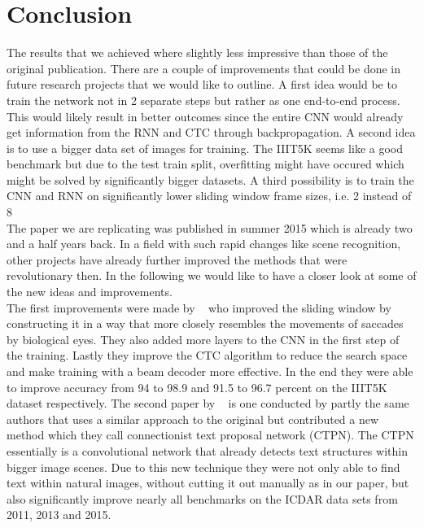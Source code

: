 \documentclass{utue} %
\begin{document}
\section{Conclusion}
The results that we achieved where slightly less impressive than those of the original publication. There are a couple of improvements that could be done in future research projects that we would like to outline. A first idea would be to train the network not in 2 separate steps but rather as one end-to-end process. This would likely result in better outcomes since the entire CNN would already get information from the RNN and CTC through backpropagation. A second idea is to use a bigger data set of images for training. The IIIT5K seems like a good benchmark but due to the test train split, overfitting might have occured which might be solved by significantly bigger datasets. A third possibility is to train the CNN and RNN on significantly lower sliding window frame sizes, i.e. 2 instead of 8 %
\\
The paper we are replicating was published in summer 2015 which is already two and a half years back. In a field with such rapid changes like scene recognition, other projects have already further improved the methods that were revolutionary then. In the following we would like to have a closer look at some of the new ideas and improvements. \\
The first improvements were made by ~\cite{DBLP:journals/corr/abs-1709-01727} who improved the sliding window by constructing it in a way that more closely resembles the movements of saccades by biological eyes. They also added more layers to the CNN in the first step of the training. Lastly they improve the CTC algorithm to reduce the search space and make training with a beam decoder more effective. In the end they were able to improve accuracy from 94 to 98.9 and 91.5 to 96.7 percent on the IIIT5K dataset respectively. 
The second paper by ~\cite{DBLP:journals/corr/TianHHH016} is one conducted by partly the same authors that uses a similar approach to the original but contributed a new method which they call connectionist text proposal network (CTPN). The CTPN essentially is a convolutional network that already detects text structures within bigger image scenes. Due to this new technique they were not only able to find text within natural images, without cutting it out manually as in our paper, but also significantly improve nearly all benchmarks on the ICDAR data sets from 2011, 2013 and 2015.
\end{document}
